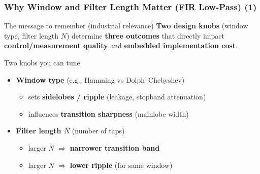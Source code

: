 \begin{frame}
	\frametitle{Why Window and Filter Length Matter (FIR Low-Pass) (1)}
	\begin{block}{The message to remember (industrial relevance)}
		\textbf{Two design knobs} (window type, filter length $N$) determine \textbf{three outcomes} that directly impact
		\textbf{control/measurement quality} and \textbf{embedded implementation cost}.
	\end{block}
	\begin{block}{Two knobs you can tune}
		\begin{itemize}
			\item \textbf{Window type} (e.g., Hamming vs Dolph--Chebyshev)
			\begin{itemize}
				\item sets \textbf{sidelobes / ripple} (leakage, stopband attenuation)
				\item influences \textbf{transition sharpness} (mainlobe width)
			\end{itemize}
			\item \textbf{Filter length $N$} (number of taps)
			\begin{itemize}
				\item larger $N$ $\Rightarrow$ \textbf{narrower transition band}
				\item larger $N$ $\Rightarrow$ \textbf{lower ripple} (for same window)
			\end{itemize}
		\end{itemize}
	\end{block}
\end{frame}

